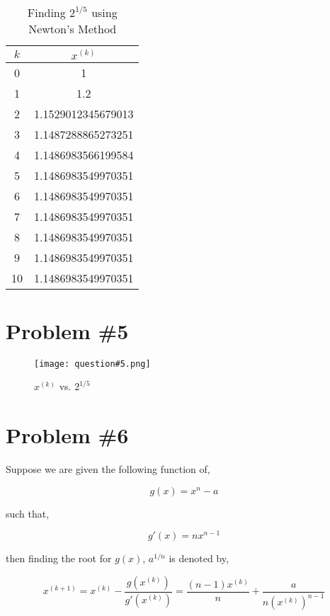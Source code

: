 \documentclass{article}
\begin{document}
\begin{table}[H]
    \centering
    \begin{tabular}{c|c}
        $k$ &  $x^{(k)}$ \\
        \hline{} 0 &  1\\
        1 & 1.2\\
        2 & 1.1529012345679013\\
        3 & 1.1487288865273251\\
        4 & 1.1486983566199584 \\
        5 & 1.1486983549970351\\
        6 & 1.1486983549970351\\
        7 & 1.1486983549970351\\
        8 & 1.1486983549970351\\
        9 & 1.1486983549970351\\
        10 &1.1486983549970351
        
    \end{tabular}
    \caption{Finding $2^{1/5}$ using Newton's Method}
    \label{tab:my_label}
\end{table}

\section*{Problem \#5}

\begin{figure}[H]
    \centering
    \texttt{[image: question\#5.png]}
    \caption{$x^{(k)}$ vs. $2^{1/5}$}
    \label{fig:my_label}
\end{figure}

\section*{Problem \#6}
Suppose we are given the following function of,

\begin{equation*}
    g(x) = x^n-a
\end{equation*}

such that,

\begin{equation*}
    g'(x) = nx^{n-1}
\end{equation*}

then finding the root for $g(x)$, $a^{1/n}$ is denoted by,

\begin{equation*}
    x^{(k+1)} = x^{(k)} - \frac{g(x^{(k)})}{g'(x^{(k)})} = \frac{(n-1)x^{(k)}}{n} + \frac{a}{n(x^{(k)})^{n-1}}
\end{equation*}
\end{document}
